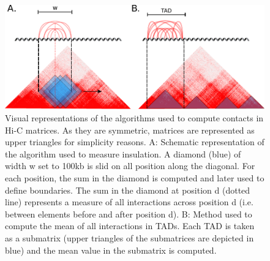 \documentclass[11pt,a4paper]{report}
\begin{document}
\begin{figure}[ht]
	\includegraphics[width=1\textwidth]{Figures/4_interactions.pdf}
	\caption{Visual representations of the algorithms used to compute contacts in Hi-C matrices. As they are symmetric, matrices are represented as upper triangles for simplicity reasons. A: Schematic representation of the algorithm used to measure insulation. A diamond (blue) of width w set to 100kb is slid on all position along the diagonal. For each position, the sum in the diamond is computed and later used to define boundaries. The sum in the diamond at position d (dotted line) represents a measure of all interactions across position d (i.e. between elements before and after position d). B: Method used to compute the mean of all interactions in TADs. Each TAD is taken as a submatrix (upper triangles of the submatrices are depicted in blue) and the mean value in the submatrix is computed. }
	\label{interact_hic}
\end{figure}
\end{document}
